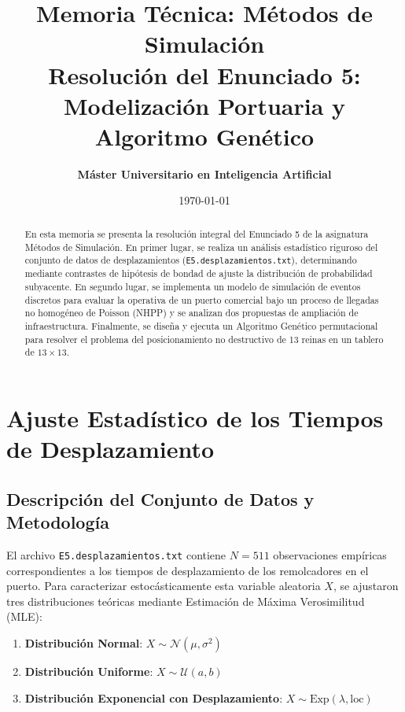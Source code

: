 \documentclass[11pt, a4paper]{article}
\title{
    \textbf{\Large Memoria Técnica: Métodos de Simulación}\\[0.3em]
    \large Resolución del Enunciado 5: Modelización Portuaria y Algoritmo Genético
}
\author{\textbf{Máster Universitario en Inteligencia Artificial}}
\date{\today}
\begin{document}
\maketitle




\begin{abstract}
En esta memoria se presenta la resolución integral del Enunciado 5 de la asignatura Métodos de Simulación. En primer lugar, se realiza un análisis estadístico riguroso del conjunto de datos de desplazamientos (\texttt{E5.desplazamientos.txt}), determinando mediante contrastes de hipótesis de bondad de ajuste la distribución de probabilidad subyacente. En segundo lugar, se implementa un modelo de simulación de eventos discretos para evaluar la operativa de un puerto comercial bajo un proceso de llegadas no homogéneo de Poisson (NHPP) y se analizan dos propuestas de ampliación de infraestructura. Finalmente, se diseña y ejecuta un Algoritmo Genético permutacional para resolver el problema del posicionamiento no destructivo de 13 reinas en un tablero de $13 \times 13$.
\end{abstract}

\tableofcontents
\newpage

\section{Ajuste Estadístico de los Tiempos de Desplazamiento}

\subsection{Descripción del Conjunto de Datos y Metodología}
El archivo \texttt{E5.desplazamientos.txt} contiene $N = 511$ observaciones empíricas correspondientes a los tiempos de desplazamiento de los remolcadores en el puerto. Para caracterizar estocásticamente esta variable aleatoria $X$, se ajustaron tres distribuciones teóricas mediante Estimación de Máxima Verosimilitud (MLE):
\begin{enumerate}
    \item \textbf{Distribución Normal}: $X \sim \mathcal{N}(\mu, \sigma^2)$
    \item \textbf{Distribución Uniforme}: $X \sim \mathcal{U}(a, b)$
    \item \textbf{Distribución Exponencial con Desplazamiento}: $X \sim \text{Exp}(\lambda, \text{loc})$
\end{enumerate}
\end{document}
